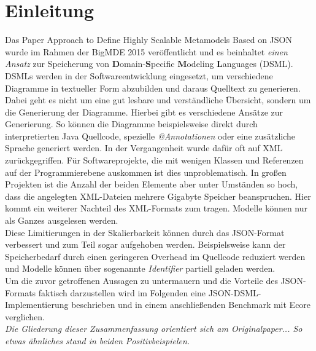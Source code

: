 \section{Einleitung}
Das Paper Approach to Define Highly Scalable Metamodels Based on JSON \cite{gerhart2015approach} wurde im Rahmen der BigMDE 2015 veröffentlicht und es beinhaltet \textit{einen Ansatz} zur Speicherung von \textbf{D}omain-\textbf{S}pecific \textbf{M}odeling \textbf{L}anguages (DSML). DSMLs werden in der Softwareentwicklung eingesetzt, um verschiedene Diagramme in textueller Form abzubilden und daraus Quelltext zu generieren. Dabei geht es nicht um eine gut lesbare und verständliche Übersicht, sondern um die Generierung der Diagramme. Hierbei gibt es verschiedene Ansätze zur Generierung. So können die Diagramme beispielsweise direkt durch interpretierten Java Quellcode, spezielle \textit{@Annotationen} oder eine zusätzliche Sprache generiert werden\cite{france2005domain}. In der Vergangenheit wurde dafür oft auf XML zurückgegriffen. Für Softwareprojekte, die mit wenigen Klassen und Referenzen auf der Programmierebene auskommen ist dies unproblematisch. In großen Projekten ist die Anzahl der beiden Elemente aber unter Umständen so hoch, dass die angelegten XML-Dateien mehrere Gigabyte Speicher beanspruchen. Hier kommt ein weiterer Nachteil des XML-Formats zum tragen. Modelle können nur als Ganzes ausgelesen werden. \\
Diese Limitierungen in der Skalierbarkeit können durch das JSON-Format verbessert und zum Teil sogar aufgehoben werden. Beispielsweise kann der Speicherbedarf durch einen geringeren Overhead im Quellcode reduziert werden und Modelle können über sogenannte \textit{Identifier} partiell geladen werden. \\
Um die zuvor getroffenen Aussagen zu untermauern und die Vorteile des JSON-Formats faktisch darzustellen wird im Folgenden eine JSON-DSML-Implementierung beschrieben und in einem anschließenden Benchmark mit Ecore verglichen. \\
\textit{Die Gliederung dieser Zusammenfassung orientiert sich am Originalpaper... \glqq So etwas ähnliches stand in beiden Positivbeispielen.\grqq} 


